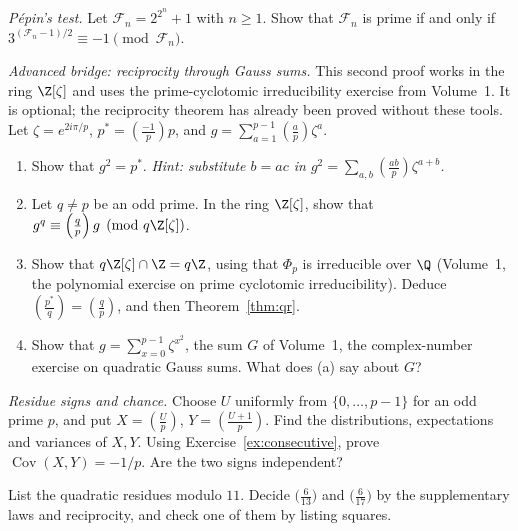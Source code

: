 \begin{exercise}[$\star\star$]\label{ex:pepin}
\emph{P\'epin's test.} Let $\mathcal F_n=2^{2^n}+1$ with $n\ge1$. Show that $\mathcal F_n$ is prime if and only if $3^{(\mathcal F_n-1)/2}\equiv-1\pmod{\mathcal F_n}$.
\end{exercise}

\begin{exercise}[$\star\star\star$]\label{ex:gausssum}
\emph{Advanced bridge: reciprocity through Gauss sums.} This second proof works in the ring $\Z[\zeta]$ and uses the prime-cyclotomic irreducibility exercise from Volume~1. It is optional; the reciprocity theorem has already been proved without these tools. Let $\zeta=e^{2i\pi/p}$, $p^*=\left(\frac{-1}p\right)p$, and $g=\sum_{a=1}^{p-1}\left(\frac ap\right)\zeta^a$.
\begin{enumerate}[label=(\alph*)]
\item Show that $g^2=p^*$. \emph{Hint: substitute $b=ac$ in $g^2=\sum_{a,b}\left(\frac{ab}p\right)\zeta^{a+b}$.}
\item Let $q\ne p$ be an odd prime. In the ring $\Z[\zeta]$, show that $g^q\equiv\left(\frac qp\right)g\pmod{q\Z[\zeta]}$.
\item Show that $q\Z[\zeta]\cap\Z=q\Z$, using that $\Phi_p$ is irreducible over $\Q$ (Volume~1, the polynomial exercise on prime cyclotomic irreducibility). Deduce $\left(\frac{p^*}q\right)=\left(\frac qp\right)$, and then Theorem~\ref{thm:qr}.
\item Show that $g=\sum_{x=0}^{p-1}\zeta^{x^2}$, the sum $G$ of Volume~1, the complex-number exercise on quadratic Gauss sums. What does (a) say about $G$?
\end{enumerate}
\end{exercise}

\begin{exercise}[$\star\star$]\label{ex:t1-residue-chance}
\emph{Residue signs and chance.} Choose $U$ uniformly from
$\{0,\dots,p-1\}$ for an odd prime $p$, and put
$X=\left(\frac Up\right)$, $Y=\left(\frac{U+1}p\right)$.
Find the distributions, expectations and variances of $X,Y$.
Using Exercise~\ref{ex:consecutive}, prove
$\operatorname{Cov}(X,Y)=-1/p$. Are the two signs independent?
\end{exercise}

\begin{exercise}[$\star$]\label{ex:t1-res11}
List the quadratic residues modulo $11$. Decide $\bigl(\frac{6}{13}\bigr)$ and $\bigl(\frac{6}{17}\bigr)$ by the supplementary laws and reciprocity, and check one of them by listing squares.
\end{exercise}


